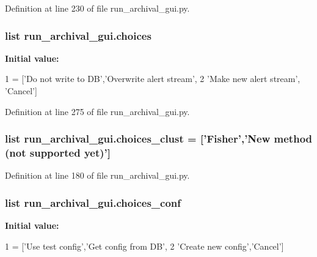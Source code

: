 Definition at line 230 of file run\-\_\-archival\-\_\-gui.\-py.

\hypertarget{namespacerun__archival__gui_a2d228f17b955250b06a982284ad9fdf6}{
\subsubsection[{choices}]{\setlength{\rightskip}{0pt plus 5cm}list run\-\_\-archival\-\_\-gui.\-choices}}\label{namespacerun__archival__gui_a2d228f17b955250b06a982284ad9fdf6}
{\bfseries Initial value\-:}
\begin{DoxyCode}
1 = [\textcolor{stringliteral}{'Do not write to DB'},\textcolor{stringliteral}{'Overwrite alert stream'},
2            \textcolor{stringliteral}{'Make new alert stream'}, \textcolor{stringliteral}{'Cancel'}]
\end{DoxyCode}


Definition at line 275 of file run\-\_\-archival\-\_\-gui.\-py.

\hypertarget{namespacerun__archival__gui_a4abdf77bd62302aa406c3109694e07b8}{
\subsubsection[{choices\-\_\-clust}]{\setlength{\rightskip}{0pt plus 5cm}list run\-\_\-archival\-\_\-gui.\-choices\-\_\-clust = \mbox{[}'Fisher','New method (not supported yet)'\mbox{]}}}\label{namespacerun__archival__gui_a4abdf77bd62302aa406c3109694e07b8}


Definition at line 180 of file run\-\_\-archival\-\_\-gui.\-py.

\hypertarget{namespacerun__archival__gui_aa423912994ac1bddf7fcb25b590089d5}{
\subsubsection[{choices\-\_\-conf}]{\setlength{\rightskip}{0pt plus 5cm}list run\-\_\-archival\-\_\-gui.\-choices\-\_\-conf}}\label{namespacerun__archival__gui_aa423912994ac1bddf7fcb25b590089d5}
{\bfseries Initial value\-:}
\begin{DoxyCode}
1 = [\textcolor{stringliteral}{'Use test config'},\textcolor{stringliteral}{'Get config from DB'},
2               \textcolor{stringliteral}{'Create new config'},\textcolor{stringliteral}{'Cancel'}]
\end{DoxyCode}


